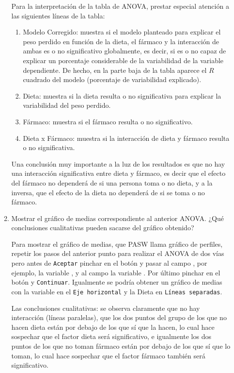 \begin{enumerate}
\begin{enumerate}
\begin{indicacion}
{Para la interpretación de la tabla de ANOVA, prestar especial atención a las siguientes líneas de la tabla:

\begin{enumerate}

\item Modelo Corregido: muestra si el modelo planteado para explicar el peso perdido en función de la dieta, el fármaco y la interacción de ambas es o no significativo globalmente, es decir, si es o no capaz de explicar un porcentaje considerable de la variabilidad de la variable dependiente. De hecho, en la parte baja de la tabla aparece el $R$ cuadrado del modelo (porcentaje de variabilidad explicado).
\item Dieta: muestra si la dieta resulta o no significativa para explicar la variabilidad del peso perdido.
\item Fármaco: muestra si el fármaco resulta o no significativo.
\item Dieta x Fármaco: muestra si la interacción de dieta y fármaco resulta o no significativa.


\end{enumerate}

Una conclusión muy importante a la luz de los resultados es que no hay una interacción significativa entre dieta y fármaco, es decir que el efecto del fármaco no dependerá de si una persona toma o no dieta, y a la inversa, que el efecto de la dieta no dependerá de si se toma o no fármaco.

}
\end{indicacion}

\item Mostrar el gráfico de medias correspondiente al anterior ANOVA. ¿Qué conclusiones cualitativas pueden sacarse del gráfico obtenido?

\begin{indicacion}{Para mostrar el gráfico de medias, que PASW llama gráfico de perfiles, repetir los pasos del anterior punto para realizar el ANOVA de dos vías pero antes de \texttt{Aceptar} pinchar en el botón  y pasar al campo , por ejemplo, la variable , y al campo  la variable . Por último pinchar en el botón  y \texttt{Continuar}. Igualmente se podría obtener un gráfico de medias con la variable  en el \texttt{Eje horizontal} y la \textsf{Dieta} en \texttt{Líneas separadas}.

Las conclusiones cualitativas: se observa claramente que no hay interacción (líneas paralelas), que los dos puntos del grupo de los que no hacen dieta están por debajo de los que sí que la hacen, lo cual hace sospechar que el factor dieta será significativo, e igualmente los dos puntos de los que no toman fármaco están por debajo de los que sí que lo toman, lo cual hace sospechar que el factor fármaco también será significativo.
}
\end{indicacion}


\end{enumerate}
\end{enumerate}

